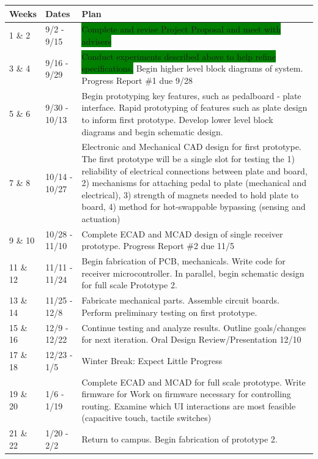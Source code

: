 \documentclass{article}
\begin{document}
	\begin{table}[H]
	\begin{tabular}{llp{4in}}
	Weeks    & Dates         & Plan \\
	\hline
	1 \& 2   & 9/2 - 9/15    &  \colorbox{green}{Complete and revise Project Proposal and meet with advisers}      \\
	3 \& 4   & 9/16 - 9/29   &  \colorbox{green}{Conduct experiments described above to help refine specifications.}  \color{green}Begin higher level block diagrams of system.  Progress Report \#1 due 9/28     \\
	5 \& 6   & 9/30 - 10/13  &  \color{green}Begin prototyping key features, such as pedalboard - plate interface. Rapid prototyping of features such as plate design to inform first prototype. Develop lower level block diagrams and begin schematic design.     \\
	7 \& 8   & 10/14 - 10/27 &  \color{yellow}Electronic and Mechanical CAD design for first prototype.  The first prototype will be a single slot for testing the 1) reliability of electrical connections between plate and board, 2) mechanisms for attaching pedal to plate (mechanical and electrical), 3) strength of magnets needed to hold plate to board, 4) method for hot-swappable bypassing (sensing and actuation)     \\
	9 \& 10  & 10/28 - 11/10 & Complete ECAD and MCAD design of single receiver prototype.  Progress Report \#2 due 11/5    \\
	11 \& 12 & 11/11 - 11/24 &  Begin fabrication of PCB, mechanicals.  Write code for receiver microcontroller.  In parallel, begin schematic design for full scale Prototype 2.  \\
	13 \& 14 & 11/25 - 12/8  &  Fabricate mechanical parts.  Assemble circuit boards.  Perform preliminary testing on first prototype.      \\
	15 \& 16 & 12/9 - 12/22  &  Continue testing and analyze results.  Outline goals/changes for next iteration.  Oral Design Review/Presentation 12/10    \\
	17 \& 18 & 12/23 - 1/5   &  Winter Break: Expect Little Progress    \\
	19 \& 20 & 1/6 - 1/19    &  Complete ECAD and MCAD for full scale prototype.  Write firmware for Work on firmware necessary for controlling routing.  Examine which UI interactions are most feasible (capacitive touch, tactile switches) \\
	21 \& 22 & 1/20 - 2/2    &  Return to campus.  Begin fabrication of prototype 2.     \\

\end{tabular}
\end{table}
\end{document}
